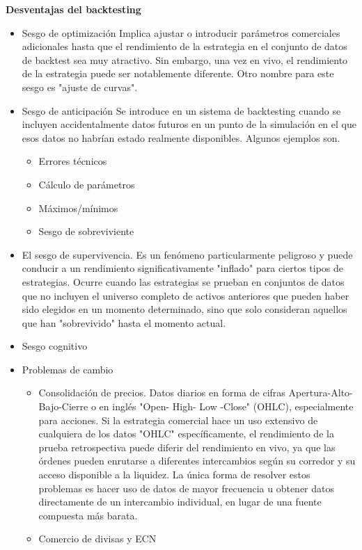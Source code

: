 \documentclass{article}
\begin{document}
\textbf{Desventajas del backtesting}
\begin{itemize}
\item Sesgo de optimización
Implica ajustar o introducir parámetros comerciales adicionales hasta que el rendimiento de la estrategia en el conjunto de datos de backtest sea muy atractivo. Sin embargo, una vez en vivo, el rendimiento de la estrategia puede ser notablemente diferente. Otro nombre para este sesgo es "ajuste de curvas".
\item Sesgo de anticipación
Se introduce en un sistema de backtesting cuando se incluyen accidentalmente datos futuros en un punto de la simulación en el que esos datos no habrían estado realmente disponibles. Algunos ejemplos son.
\begin{itemize}
\item Errores técnicos
\item Cálculo de parámetros
\item Máximos/mínimos
\item Sesgo de sobreviviente
\end{itemize}

\item El sesgo de supervivencia.
Es un fenómeno particularmente peligroso y puede conducir a un rendimiento significativamente "inflado" para ciertos tipos de estrategias. Ocurre cuando las estrategias se prueban en conjuntos de datos que no incluyen el universo completo de activos anteriores que pueden haber sido elegidos en un momento determinado, sino que solo consideran aquellos que han "sobrevivido" hasta el momento actual.
\item Sesgo cognitivo
\item Problemas de cambio
\begin{itemize}
    \item  Consolidación de precios.
Datos diarios en forma de cifras Apertura-Alto-Bajo-Cierre o en inglés "Open- High- Low -Close" (OHLC), especialmente para acciones. Si la estrategia comercial hace un uso extensivo de cualquiera de los datos "OHLC" específicamente, el rendimiento de la prueba retrospectiva puede diferir del rendimiento en vivo, ya que las órdenes pueden enrutarse a diferentes intercambios según su corredor y su acceso disponible a la liquidez. La única forma de resolver estos problemas es hacer uso de datos de mayor frecuencia u obtener datos directamente de un intercambio individual, en lugar de una fuente compuesta más barata.
\item Comercio de divisas y ECN
\end{itemize}


\end{itemize}
\end{document}
